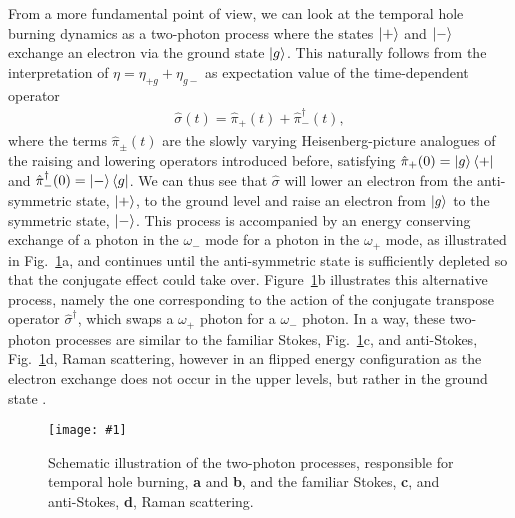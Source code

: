 \documentclass[reprint,secnumarabic,amssymb, nobibnotes, aip, prd]{revtex4-1}
\def\P{\hat{\pi}_+}
\def\M{\hat{\pi}_-}
\newcommand{\includegraphicsXL}[1]{\texttt{[image: \#1]}}
\begin{document}
From a more fundamental point of view, we can look at the temporal hole burning dynamics as a two-photon process where the states $\ket{+}$ and $\ket{-}$ exchange an electron via the ground state $\ket{g}$. This naturally follows from the interpretation of $\eta = \eta_{+g}+\eta_{g-}$ as expectation value of the time-dependent operator \cite{loudon2000quantum}
\begin{align}
\hat\sigma(t) = \P(t) +\M^{\dagger}(t),
\end{align}
where the terms $\hat\pi_{\pm}(t)$ are the slowly varying Heisenberg-picture analogues of the raising and lowering operators introduced before, satisfying $\P(0) =\ket{g}\bra{+}$ and $\M^{\dagger}(0)=\ket{-}\bra{g}$. We can thus see that $\hat\sigma$ will lower an electron from the anti-symmetric state, $\ket{+}$, to the ground level and raise an electron from $\ket{g}$ to the symmetric state, $\ket{-}$. This process is accompanied by an energy conserving exchange of a photon in the $\omega_{-}$ mode for a photon in the $\omega_{+}$ mode, as illustrated in Fig.~\ref{fig:two_photon_process}a, and continues until the anti-symmetric state is sufficiently depleted so that the conjugate effect could take over. Figure~\ref{fig:two_photon_process}b illustrates this alternative process, namely the one corresponding to the action of the conjugate transpose operator $\hat{\sigma}^{\dagger}$, which swaps a $\omega_+$ photon for a $\omega_-$ photon. In a way, these two-photon processes are similar to the familiar Stokes, Fig.~\ref{fig:two_photon_process}c, and anti-Stokes, Fig.~\ref{fig:two_photon_process}d, Raman scattering, however in an flipped energy configuration as the electron exchange does not occur in the upper levels, but rather in the ground state \cite{butcher1991elements}. 
\begin{figure}[h!]
	\begin{center}
		\includegraphicsXL{IMGS/two_photon_process.eps}
		\caption{Schematic illustration of the two-photon processes, responsible for temporal hole burning, \textbf{a} and \textbf{b}, and the familiar Stokes, \textbf{c}, and anti-Stokes, \textbf{d}, Raman scattering.} \label{fig:two_photon_process}
	\end{center}	
\end{figure}
\end{document}
